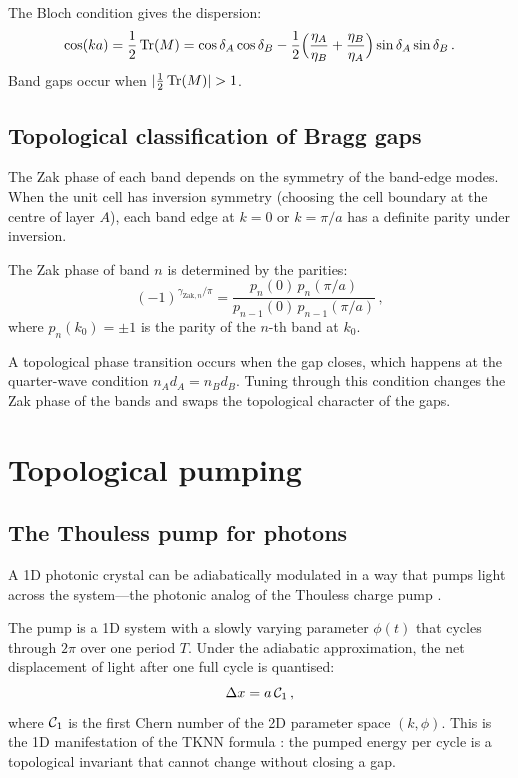The Bloch condition gives the dispersion:
\begin{equation}\label{eq:ch14-bloch-condition}
  \cos(ka) = \frac{1}{2}\operatorname{Tr}(M)
  = \cos\delta_A\cos\delta_B
  - \frac{1}{2}\Bigl(\frac{\eta_A}{\eta_B}+\frac{\eta_B}{\eta_A}\Bigr)
  \sin\delta_A\sin\delta_B\,.
\end{equation}
Band gaps occur when $|\frac{1}{2}\Tr(M)|>1$.

\subsection{Topological classification of Bragg gaps}
\label{sec:ch14-bragg-topology}

The Zak phase of each band depends on the symmetry of the
band-edge modes.  When the unit cell has inversion symmetry
(choosing the cell boundary at the centre of layer $A$), each band
edge at $k=0$ or $k=\pi/a$ has a definite parity under inversion.

The Zak phase of band $n$ is determined by the parities:
\begin{equation}\label{eq:ch14-zak-from-parity}
  (-1)^{\gamma_{\mathrm{Zak},n}/\pi}
  = \frac{p_n(0)\,p_n(\pi/a)}{p_{n-1}(0)\,p_{n-1}(\pi/a)}\,,
\end{equation}
where $p_n(k_0)=\pm 1$ is the parity of the $n$-th band at $k_0$.

A topological phase transition occurs when the gap closes, which happens
at the quarter-wave condition $n_Ad_A=n_Bd_B$.  Tuning through this
condition changes the Zak phase of the bands and swaps the topological
character of the gaps.

\section{Topological pumping}
\label{sec:ch14-pumping}

\subsection{The Thouless pump for photons}
\label{sec:ch14-thouless}

A 1D photonic crystal can be adiabatically modulated in a way that pumps
light across the system---the photonic analog of the Thouless charge
pump \cite{thouless1982quantized,ozawa2018topological} \cite{lohse2015thouless}.

The pump is a 1D system with a slowly varying parameter $\phi(t)$
that cycles through $2\pi$ over one period $T$.  Under the adiabatic
approximation, the net displacement of light after one full cycle is
quantised:
\begin{equation}\label{eq:ch14-pump-displacement}
  \Delta x = a\,\mathcal{C}_1\,,
\end{equation}
where $\mathcal{C}_1$ is the first Chern number of the 2D parameter space
$(k,\phi)$.  This is the 1D manifestation of the TKNN formula
\cite{thouless1982quantized}: the pumped energy per cycle is a
topological invariant that cannot change without closing a gap.

